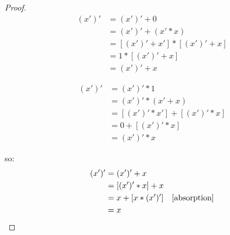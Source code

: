 \documentclass{article}
\begin{document}
\begin{proof}
\begin{align*}
(x')' & = (x')' + 0 \\
      & = (x')' + (x' * x) \\
      & = [(x')' + x'] * [(x')' + x]\\
      & = 1 * [(x')' + x] \\
      & = (x')' + x
\end{align*}

\begin{align*}
(x')' & = (x')' * 1 \\
      & = (x')' * (x' + x) \\
      & = [(x')' * x'] + [(x')' * x]\\
      & = 0 + [(x')' * x] \\
      & = (x')' * x
\end{align*}

so:
\begin{align*}
(x')' & = (x')' + x \\
      & = [(x')' * x] + x \\
      & = x + [x * (x')'] & \ref{absorption} \\
      & = x
\end{align*}

\end{proof}
\end{document}

